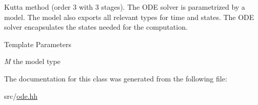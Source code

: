 Kutta method (order 3 with 3 stages). The ODE solver is parametrized by a model. The model also exports all relevant types for time and states. The ODE solver encapsulates the states needed for the computation.


\begin{DoxyTemplParams}{Template Parameters}
\item[{\em M}]the model type \end{DoxyTemplParams}


The documentation for this class was generated from the following file:\begin{DoxyCompactItemize}
\item 
src/\hyperlink{ode_8hh}{ode.hh}\end{DoxyCompactItemize}
